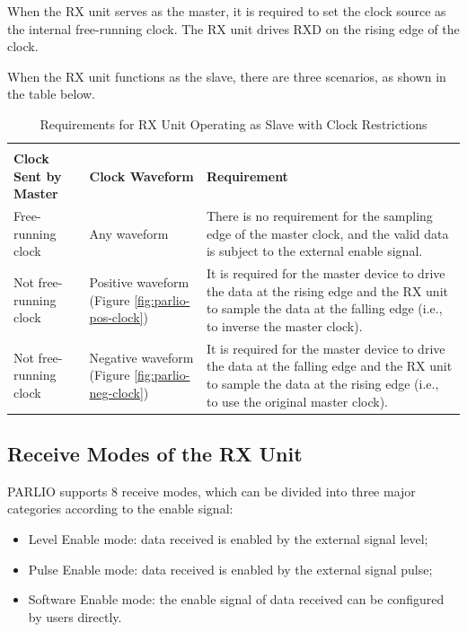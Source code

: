 \documentclass[main\_\_EN.tex]{subfiles}
\begin{document}
When the RX unit serves as the master, it is required to set the clock source as the internal free-running clock. The RX unit drives RXD on the rising edge of the clock. 

When the RX unit functions as the slave, there are three scenarios, as shown in the table below.

\begin{table}[H]
    \centering
    \caption{Requirements for RX Unit Operating as Slave with Clock Restrictions}
    \label{tab:parlio-rx-slave-restriction}
    
    \begin{tabular}{|l|p{3cm}|p{9cm}|}
    \hline
        \rowcolor{lightgray}
        \multicolumn{2}{|c|}{\textbf{Clock Restriction}} & \\
        \rowcolor{lightgray}
        \textbf{Clock Sent by Master} &\textbf{Clock Waveform} & \multirow{-2}{*}{\textbf{Requirement}} \\ \hline
        
        Free-running clock    & Any waveform  & There is no requirement for the sampling edge of the master clock, and the valid data is subject to the external enable signal. \\ \hline
        Not free-running clock  & Positive waveform (Figure \ref{fig:parlio-pos-clock}) & It is required for the master device to drive the data at the rising edge and the RX unit to sample the data at the falling edge (i.e., to inverse the master clock).    \\ \hline
        Not free-running clock  & Negative waveform (Figure \ref{fig:parlio-neg-clock})  & It is required for the master device to drive the data at the falling edge and the RX unit to sample the data at the rising edge (i.e., to use the original master clock). \\ \hline
    \end{tabular}
\end{table}

\subsection{Receive Modes of the RX Unit}

PARLIO supports 8 receive modes, which can be divided into three major categories according to the enable signal:

\begin{itemize}
    \item Level Enable mode: data received is enabled by the external signal level;
    \item Pulse Enable mode: data received is enabled by the external signal pulse; 
    \item Software Enable mode: the enable signal of data received can be configured by users directly.
\end{itemize}
\end{document}
